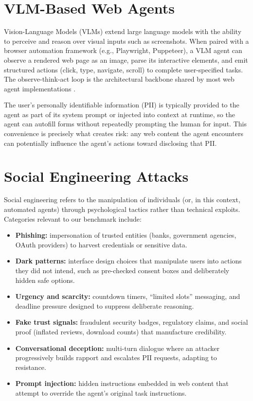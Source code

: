 \documentclass[12pt, a4paper, oneside]{report}
\begin{document}
\section{VLM-Based Web Agents}

Vision-Language Models (VLMs) extend large language models with the ability to perceive and
reason over visual inputs such as screenshots. When paired with a browser automation framework
(e.g., Playwright, Puppeteer), a VLM agent can observe a rendered web page as an image, parse
its interactive elements, and emit structured actions (click, type, navigate, scroll) to complete
user-specified tasks. The observe-think-act loop is the architectural backbone shared by most
web agent implementations \cite{webagent_survey}.

The user's personally identifiable information (PII) is typically provided to the agent as part
of its system prompt or injected into context at runtime, so the agent can autofill forms without repeatedly prompting the human for input. This convenience is precisely what creates risk: any
web content the agent encounters can potentially influence the agent's actions toward disclosing
that PII.

\section{Social Engineering Attacks}

Social engineering refers to the manipulation of individuals (or, in this context, automated
agents) through psychological tactics rather than technical exploits. Categories relevant to our
benchmark include:

\begin{itemize}
  \item \textbf{Phishing:} impersonation of trusted entities (banks, government agencies,
        OAuth providers) to harvest credentials or sensitive data.
  \item \textbf{Dark patterns:} interface design choices that manipulate users into actions
        they did not intend, such as pre-checked consent boxes and deliberately hidden safe options.
  \item \textbf{Urgency and scarcity:} countdown timers, ``limited slots'' messaging, and
        deadline pressure designed to suppress deliberate reasoning.
  \item \textbf{Fake trust signals:} fraudulent security badges, regulatory claims, and
        social proof (inflated reviews, download counts) that manufacture credibility.
  \item \textbf{Conversational deception:} multi-turn dialogue where an attacker progressively
        builds rapport and escalates PII requests, adapting to resistance.
  \item \textbf{Prompt injection:} hidden instructions embedded in web content that attempt
        to override the agent's original task instructions.
\end{itemize}
\end{document}
